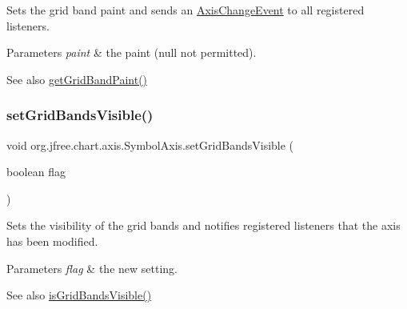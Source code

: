 Sets the grid band paint and sends an \mbox{\hyperlink{}{Axis\+Change\+Event}} to all registered listeners.


\begin{DoxyParams}{Parameters}
{\em paint} & the paint ({\ttfamily null} not permitted).\\
\hline
\end{DoxyParams}
\begin{DoxySeeAlso}{See also}
\mbox{\hyperlink{classorg_1_1jfree_1_1chart_1_1axis_1_1_symbol_axis_a180cbfcf9840f685400f6658e4fc29dc}{get\+Grid\+Band\+Paint()}} 
\end{DoxySeeAlso}
\mbox{\label{classorg_1_1jfree_1_1chart_1_1axis_1_1_symbol_axis_a318debeb1189f1186c072082270d3d09}} 
\subsubsection{\texorpdfstring{set\+Grid\+Bands\+Visible()}{setGridBandsVisible()}}
{\footnotesize\ttfamily void org.\+jfree.\+chart.\+axis.\+Symbol\+Axis.\+set\+Grid\+Bands\+Visible (\begin{DoxyParamCaption}\item[{boolean}]{flag }\end{DoxyParamCaption})}

Sets the visibility of the grid bands and notifies registered listeners that the axis has been modified.


\begin{DoxyParams}{Parameters}
{\em flag} & the new setting.\\
\hline
\end{DoxyParams}
\begin{DoxySeeAlso}{See also}
\mbox{\hyperlink{classorg_1_1jfree_1_1chart_1_1axis_1_1_symbol_axis_a0201bb1eb987ff0fccdb1ed6401f6546}{is\+Grid\+Bands\+Visible()}} 
\end{DoxySeeAlso}
\mbox{\label{classorg_1_1jfree_1_1chart_1_1axis_1_1_symbol_axis_a43a6ecf2b167e2d71036ad4cb7d5b8b3}} 
